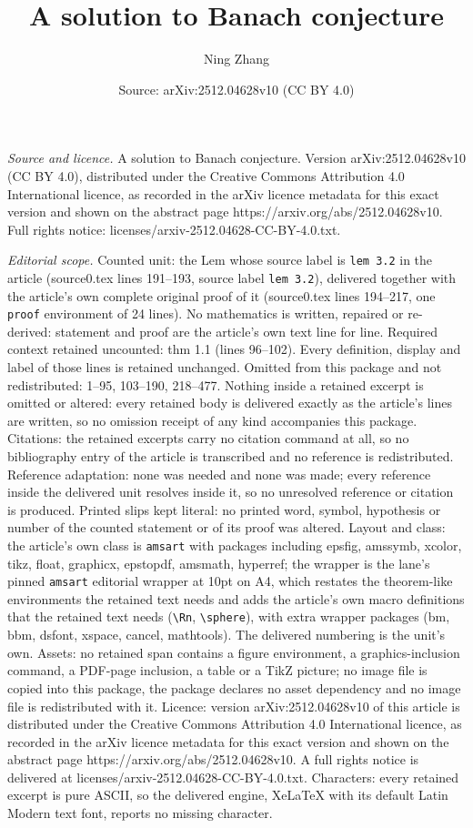 \documentclass[10pt,a4paper]{amsart}
\title[A solution to Banach conjecture]{A solution to Banach conjecture}
\author{Ning Zhang}
\date{Source: arXiv:2512.04628v10 (CC BY 4.0)}
\begin{document}
\maketitle

\noindent\emph{Source and licence.} A solution to Banach conjecture. Version arXiv:2512.04628v10 (CC BY 4.0), distributed under the Creative Commons Attribution 4.0 International licence, as recorded in the arXiv licence metadata for this exact version and shown on the abstract page https://arxiv.org/abs/2512.04628v10. Full rights notice: licenses/arxiv-2512.04628-CC-BY-4.0.txt.\par\smallskip

\noindent\textit{Editorial scope.} Counted unit: the Lem whose source label is \texttt{lem 3.2} in the article (source0.tex lines 191--193, source label \texttt{lem 3.2}), delivered together with the article's own complete original proof of it (source0.tex lines 194--217, one \texttt{proof} environment of 24 lines). No mathematics is written, repaired or re-derived: statement and proof are the article's own text line for line. Required context retained uncounted: thm 1.1 (lines 96--102). Every definition, display and label of those lines is retained unchanged. Omitted from this package and not redistributed: 1--95, 103--190, 218--477. Nothing inside a retained excerpt is omitted or altered: every retained body is delivered exactly as the article's lines are written, so no omission receipt of any kind accompanies this package. Citations: the retained excerpts carry no citation command at all, so no bibliography entry of the article is transcribed and no reference is redistributed. Reference adaptation: none was needed and none was made; every reference inside the delivered unit resolves inside it, so no unresolved reference or citation is produced. Printed slips kept literal: no printed word, symbol, hypothesis or number of the counted statement or of its proof was altered. Layout and class: the article's own class is \texttt{amsart} with packages including epsfig, amssymb, xcolor, tikz, float, graphicx, epstopdf, amsmath, hyperref; the wrapper is the lane's pinned \texttt{amsart} editorial wrapper at 10pt on A4, which restates the theorem-like environments the retained text needs and adds the article's own macro definitions that the retained text needs (\texttt{\textbackslash Rn}, \texttt{\textbackslash sphere}), with extra wrapper packages (bm, bbm, dsfont, xspace, cancel, mathtools). The delivered numbering is the unit's own. Assets: no retained span contains a figure environment, a graphics-inclusion command, a PDF-page inclusion, a table or a TikZ picture; no image file is copied into this package, the package declares no asset dependency and no image file is redistributed with it. Licence: version arXiv:2512.04628v10 of this article is distributed under the Creative Commons Attribution 4.0 International licence, as recorded in the arXiv licence metadata for this exact version and shown on the abstract page https://arxiv.org/abs/2512.04628v10. A full rights notice is delivered at licenses/arxiv-2512.04628-CC-BY-4.0.txt. Characters: every retained excerpt is pure ASCII, so the delivered engine, XeLaTeX with its default Latin Modern text font, reports no missing character.
\end{document}

